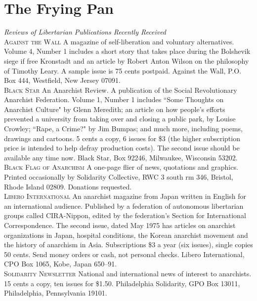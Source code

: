 \chapter{The Frying Pan}
\vspace{-1cm}
\emph{Reviews of Libertarian Publications Recently Received}\\

\noindent\textsc{Against the Wall} A magazine of self-liberation and voluntary alternatives. Volume 4, Number 1 includes a short story that takes place during the Bolshevik siege if free Kronstadt and an article by Robert Anton Wilson on the philosophy of Timothy Leary. A sample issue is 75 cents postpaid. Against the Wall, P.O. Box 444, Westfield, New Jersey 07091.\\

\noindent\textsc{Black Star} An Anarchist Review. A publication of the Social Revolutionary Anarchist Federation. Volume 1, Number 1 includes ``Some Thoughts on Anarchist Culture" by Glenn Meredith; an article on how people's efforts prevented a university from taking over and closing a public park, by Louise Crowley; ``Rape, a Crime?" by Jim Bumpas; and much more, including poems, drawings and cartoons. 5 cents a copy, 6 issues for \$3 (the higher subscription price is intended to help defray production costs). The second issue should be available any time now. Black Star, Box 92246, Milwaukee, Wisconsin 53202.\\

\noindent\textsc{Black Flag of Anarchism} A one-page flier of news, quotations and graphics. Printed occasionally by Solidarity Collective, RWC 3 south rm 346, Bristol, Rhode Island 02809. Donations requested.\\

\noindent\textsc{Libero International} An anarchist magazine from Japan written in English for an international audience. Published by a federation of autonomous libertarian groups called CIRA-Nippon, edited by the federation's Section for International Correspondence. The second issue, dated May 1975 has articles on anarchist organizations in Japan, hospital conditions, the Korean anarchist movement and the history of anarchism in Asia. Subscriptions \$3 a year (six issues), single copies 50 cents. Send money orders or cash, not personal checks. Libero International, CPO Box 1065, Kobe, Japan 650--91.\\

\noindent\textsc{Solidarity Newsletter} National and international news of interest to anarchists. 15 cents a copy, ten issues for \$1.50. Philadelphia Solidarity, GPO Box 13011, Philadelphia, Pennsylvania 19101.\\

